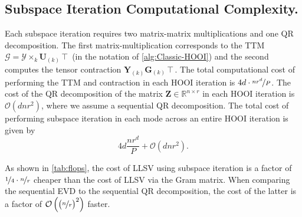     \subsection{Subspace Iteration Computational Complexity.}
        Each subspace iteration requires two matrix-matrix multiplications and
        one QR decomposition. The first matrix-multiplication corresponds to the
        TTM $\mathcal{G}=\mathcal{Y} \times_k \mathbf{U}_{(k)}\intercal$ (in the
        notation of \cref{alg:Classic-HOOI}) and the second computes the tensor
        contraction $\mathbf{Y}_{(k)}\mathbf{G}_{(k)}\intercal$. The total computational cost of
        performing the TTM and contraction in each HOOI iteration is
        $4d\cdot\nicefrac{nr^d}{P}$. The cost of the QR decomposition of the
        matrix $\mathbf{Z} \in \mathbb{R}^{n\times r}$ in each HOOI iteration is
        $\mathcal{O}(dnr^2)$, where we assume a sequential QR decomposition. The
        total cost of performing subspace iteration in each mode across an
        entire HOOI iteration is given by
        \begin{equation*}
            4d\frac{nr^d}{P} + \mathcal{O}(dnr^2).
        \end{equation*}

        As shown in \cref{tab:flops}, the cost of LLSV using subspace iteration is a
        factor of $\nicefrac{1}{4} \cdot \nicefrac{n}{r}$ cheaper than the cost of LLSV via the
        Gram matrix.
        When comparing the sequential EVD to the sequential QR decomposition,
        the cost of the latter is a factor of
        $\mathcal{O}\left(\big(\nicefrac{n}{r}\big)^2\right)$ faster.

